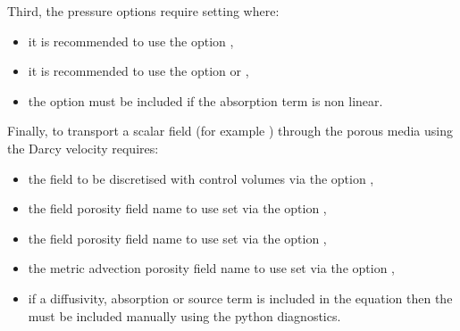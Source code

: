 Third, the pressure options require setting where:
\begin{itemize}
\item it is recommended to use the option ,
\item it is recommended to use the option  or ,
\item the option  must be included if the absorption term is non linear.
\end{itemize}

Finally, to transport a scalar field (for example ) through the porous media using the Darcy velocity requires:
\begin{itemize}
\item the  field to be discretised with control volumes via the option ,
\item the  field porosity field name to use set via the option ,
\item the  field porosity field name to use set via the option ,
\item the metric advection porosity field name to use set via the option ,
\item if a diffusivity, absorption or source term is included in the  equation then the  must be included manually using the python diagnostics.
\end{itemize}
 
